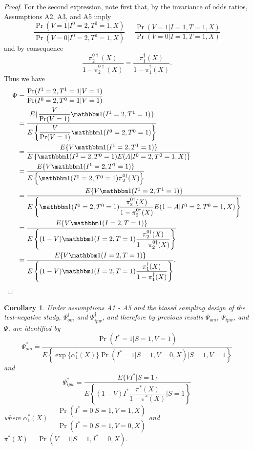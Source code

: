 \documentclass{article}
\newtheorem{corollary}{Corollary}
\begin{document}
\begin{proof}
For the second expression, note first that, by the invariance of odds ratios, Assumptions A2, A3, and A5 imply
\begin{equation*}
    \dfrac{\Pr(V = 1 | I^0 = 2, T^0 = 1, X)}{\Pr(V = 0 | I^0 = 2,  T^0 = 1, X)} = \dfrac{\Pr(V = 1 | I = 1, T = 1, X)}{\Pr(V = 0 | I = 1,  T = 1, X)}
\end{equation*}
and by consequence 
\begin{equation*}
    \dfrac{\pi^{0\dagger}_2(X)}{1 - \pi^{0\dagger}_2(X)} = \dfrac{\pi^\dagger_1(X)}{1 - \pi^\dagger_1(X)}.
\end{equation*}
Thus we have
\begin{align*}
    \Psi &= \dfrac{\Pr(I^1=2, T^1 = 1|V=1)}{\Pr(I^0=2, T^0 = 1|V=1)} \\
    &= \dfrac{E\{\dfrac{V}{\Pr(V=1)} \mathbbm 1 (I^1 = 2, T^1 = 1)\}}{E\left\{\dfrac{V}{\Pr(V=1)}\mathbbm 1 (I^0 = 2, T^0 = 1)\right\}} \\
    &= \dfrac{E\{V \mathbbm 1 (I^1 = 2, T^1 = 1)\}}{E\left\{\mathbbm 1 (I^0 = 2, T^0 = 1) E(A | I^0 = 2, T^0 = 1, X)\right\}} \\
    &= \dfrac{E\{V \mathbbm 1 (I^1 = 2, T^1 = 1)\}}{E\left\{\mathbbm 1 (I^0 = 2, T^0 = 1) \pi^{0\dagger}_2(X)\right\}} \\
    &= \dfrac{E\{V \mathbbm 1 (I^1 = 2, T^1 = 1)\}}{E\left\{\mathbbm 1 (I^0 = 2, T^0 = 1) \dfrac{\pi^{0\dagger}_2(X)}{1-\pi^{0\dagger}_2(X)}E(1-A|I^0 = 2, T^0 = 1, X)\right\}} \\
    &= \dfrac{E\{V \mathbbm 1 (I = 2, T = 1)\}}{E\left\{(1 - V)\mathbbm 1 (I = 2, T = 1) \dfrac{\pi^{0\dagger}_2(X)}{1-\pi^{0\dagger}_2(X)}\right\}} \\
    &= \dfrac{E\{V \mathbbm 1 (I = 2, T = 1)\}}{E\left\{(1 - V)\mathbbm 1 (I = 2, T = 1) \dfrac{\pi^\dagger_1(X)}{1-\pi^\dagger_1(X)}\right\}}.
\end{align*}
\end{proof}
\newpage 
\begin{corollary}
Under assumptions A1 - A5 and the biased sampling design of the test-negative study, $\Psi^\dagger_{om}$ and $\Psi^\dagger_{ipw}$, and therefore by previous results $\Psi_{om}$, $\Psi_{ipw}$, and $\Psi$, are identified by
\begin{equation}
    \Psi_{om}^* = \dfrac{\Pr(I^* = 1 | S = 1, V = 1)}{E\left\{ \exp\{\alpha^*_1(X)\} \Pr(I^* = 1 | S = 1, V = 0, X) \Big| S = 1, V = 1 \right\}}
\end{equation}
and 
\begin{equation}
    \Psi_{ipw}^* = \dfrac{E\{VI^*|S =1\}}{E\left\{ (1 - V) I^* \dfrac{\pi^*(X)}{1 - \pi^*(X)} \bigg| S = 1\right\}}
\end{equation}
where $\alpha^*_1(X) = \dfrac{\Pr(I^* = 0 | S = 1, V = 1, X)}{\Pr(I^* = 0| S = 1, V = 0, X)}$ and $\pi^*(X) = \Pr(V = 1| S = 1, I^* = 0, X)$.
\end{corollary}
\end{document}
